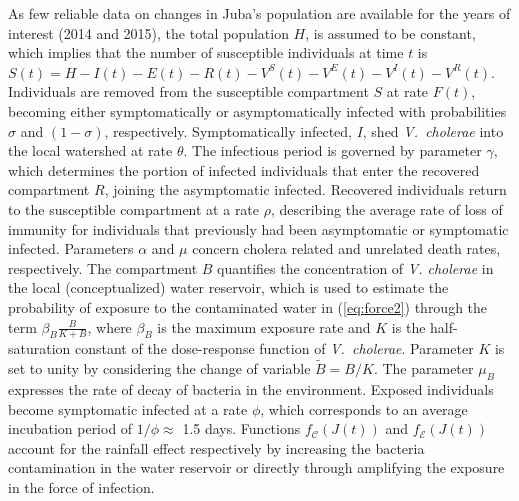 As few reliable data on changes in Juba's population are available for the years of interest (2014 and 2015), the total population $H$, is assumed to be constant, which implies that the number of susceptible individuals at time $t$ is $S(t) = H - I(t) - E(t) - R(t) - V^S(t) - V^E(t) - V^I(t) - V^R(t)$. Individuals are removed from the susceptible compartment $S$ at rate $F(t)$, becoming either symptomatically or asymptomatically infected with probabilities $\sigma$ and $(1-\sigma)$, respectively. Symptomatically infected, $I$, shed \textit{V.~cholerae} into the local watershed at rate $\theta$. 
The infectious period is governed by parameter $\gamma$, which determines the portion of infected individuals that enter the recovered compartment $R$, joining the asymptomatic infected. Recovered individuals return to the susceptible compartment at a rate $\rho$, describing the average rate of loss of immunity for individuals that previously had been asymptomatic or symptomatic infected. Parameters $\alpha$ and $\mu$ concern cholera related and unrelated death rates, respectively. The compartment $B$ quantifies the concentration of \textit{V. cholerae} in the local (conceptualized) water reservoir, which is used to estimate the probability of exposure to the contaminated water in (\ref{eq:force2}) through the term $\beta_B  \frac{B}{K+B}$, where  $\beta_B$ is the maximum exposure rate and $K$ is the half-saturation constant of the dose-response function of \textit{V.~cholerae}\cite{Codeco:EndemicEpidemicDynamics:2001}. Parameter $K$ is set to unity by considering the change of variable $\tilde{B}=B/K$. The parameter $\mu_B$ expresses the rate of decay of bacteria in the environment. 
Exposed individuals become symptomatic infected at a rate $\phi$, which corresponds to an average incubation period of $1/\phi\approx$ 1.5 days\cite{Azman:IncubationPeriodCholera:2013}.
Functions $f_{\mathcal{C}}\left(J(t)\right)$ and $f_{\mathcal{E}}\left(J(t)\right)$ account for the rainfall effect respectively by increasing the bacteria contamination in the water reservoir or directly through amplifying the exposure in the force of infection.
